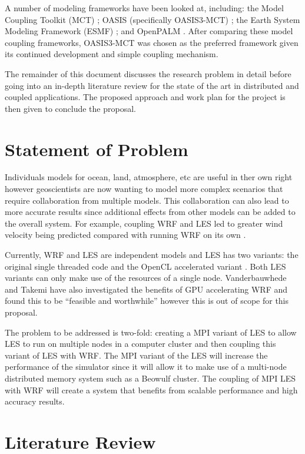 \documentclass{acm_proc_article-sp}
\begin{document}
A number of modeling frameworks have been looked at, including: the Model
Coupling Toolkit (MCT) \cite{Larson2005,Jacob2005}; OASIS (specifically
OASIS3-MCT) \cite{Valcke,Valcke2013}; the Earth System Modeling Framework (ESMF)
\cite{Ramework2004}; and OpenPALM \cite{Piacentini2011}. After comparing these
model coupling frameworks, OASIS3-MCT was chosen as the preferred framework
given its continued development and simple coupling mechanism.

The remainder of this document discusses the research problem in detail before
going into an in-depth literature review for the state of the art in distributed
and coupled applications. The proposed approach and work plan for the project is
then given to conclude the proposal.

\section*{Statement of Problem}

Individuals models for ocean, land, atmosphere, etc are useful in ther own right
however geoscientists are now wanting to model more complex scenarios that
require collaboration from multiple models. This collaboration can also lead to
more accurate results since additional effects from other models can be added to
the overall system. For example, coupling WRF and LES led to greater wind
velocity being predicted compared with running WRF on its own
\cite{Kinbara2010,Nakayama1998}.

Currently, WRF and LES are independent models and LES has two variants: the
original single threaded code and the OpenCL accelerated variant
\cite{Vanderbauwhede2014}. Both LES variants can only make use of the resources
of a single node. Vanderbauwhede and Takemi \cite{Vanderbauwhede2013} have also
investigated the benefits of GPU accelerating WRF and found this to be
``feasible and worthwhile'' however this is out of scope for this proposal.

The problem to be addressed is two-fold: creating a MPI variant of LES to allow
LES to run on multiple nodes in a computer cluster and then coupling this
variant of LES with WRF. The MPI variant of the LES will increase the
performance of the simulator since it will allow it to make use of a multi-node
distributed memory system such as a Beowulf cluster. The coupling of MPI LES
with WRF will create a system that benefits from scalable performance and high
accuracy results.

\section*{Literature Review}
\end{document}
